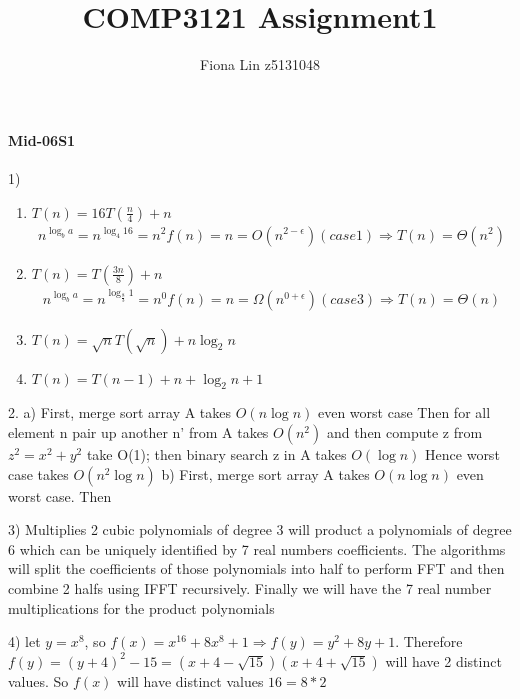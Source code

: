 \documentclass[a4paper]{scrartcl}
\title{COMP3121 Assignment1}
\author{Fiona Lin z5131048}
\begin{document}
\maketitle
\paragraph{Mid-06S1} 1) 
\begin{enumerate}[label=\alph*]
  \item $T(n) = 16T(\frac{n}{4}) + n $
  \begin{align*}
    n^{\log_b{a}} = n^{\log_4{16}} = n^2
    f(n) = n = O(n^{2-\epsilon}) (case 1) \Rightarrow T(n)=\Theta(n^2)    
  \end{align*}
  \item $T(n) = T(\frac{3n}{8}) + n $
  \begin{align*}
    n^{\log_b{a}} = n^{\log_{\frac{8}{3}}{1}} = n^0
    f(n) = n = \Omega(n^{0+\epsilon}) (case 3) \Rightarrow T(n) = \Theta(n)
  \end{align*}
  \item $T(n) = \sqrt{n}T(\sqrt{n}) + n\log_2{n}$
  
  \item $T(n) = T(n-1) + n + \log_2{n} + 1$
\end{enumerate}
2. a) 
First, merge sort array A takes $O(n\log{n})$ even worst case
Then for all element n pair up another n' from A takes $O(n^2)$
and then compute z from $z^2 = x^2+y^2$ take O(1); then binary search 
z in A takes $O(\log{n})$
Hence worst case takes $O(n^2\log{n})$ 
b) First, merge sort array A takes $O(n\log{n})$ even worst case.
Then


3) Multiplies 2 cubic polynomials of degree 3 will product a polynomials of degree
6 which can be uniquely identified by 7 real numbers coefficients.
The algorithms will split the coefficients of those polynomials into half to perform 
FFT and then combine 2 halfs using IFFT recursively. 
Finally we will have the 7 real number multiplications for the product polynomials

4) let  $y=x^8$, so $f(x)=x^16 + 8x^8 +1\Rightarrow f(y)=y^2+8y+1$.
Therefore $f(y)=(y+4)^2-15=(x+4-\sqrt{15})(x+4+\sqrt{15})$ will have 2 distinct values. 
So $f(x)$ will have distinct values $16 = 8*2$ 
\end{document}
